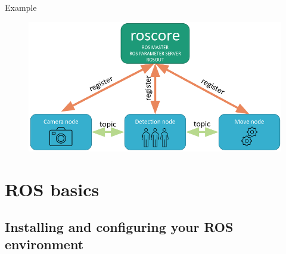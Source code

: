 \begin{frame}{Example}
\begin{figure}
    \centering
    \includegraphics[scale=0.4]{img/ros/nodos_topics.png}
\end{figure}

\end{frame}

\section{ROS basics}

\subsection{Installing and configuring your ROS environment}

